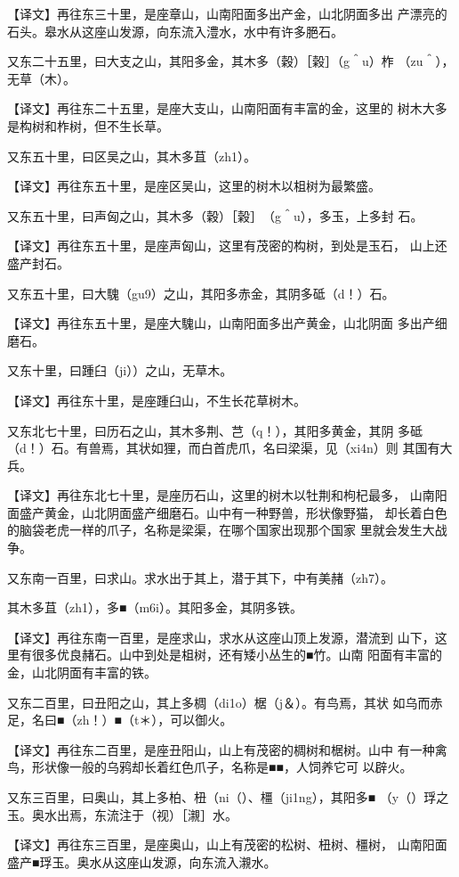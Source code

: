 \documentclass[a4paper,12pt,UTF8,twoside]{ctexbook}
\begin{document}
【译文】再往东三十里，是座章山，山南阳面多出产金，山北阴面多出 产漂亮的石头。皋水从这座山发源，向东流入澧水，水中有许多脃石。

又东二十五里，曰大支之山，其阳多金，其木多（穀）［榖］（g＾u）柞 （zu＾），无草（木）。

【译文】再往东二十五里，是座大支山，山南阳面有丰富的金，这里的 树木大多是构树和柞树，但不生长草。

又东五十里，曰区吴之山，其木多苴（zh1）。

【译文】再往东五十里，是座区吴山，这里的树木以柤树为最繁盛。

又东五十里，曰声匈之山，其木多（穀）［榖］　（g＾u），多玉，上多封 石。

【译文】再往东五十里，是座声匈山，这里有茂密的构树，到处是玉石， 山上还盛产封石。

又东五十里，曰大騩（gu9）之山，其阳多赤金，其阴多砥（d！）石。

【译文】再往东五十里，是座大騩山，山南阳面多出产黄金，山北阴面 多出产细磨石。

又东十里，曰踵臼（ji））之山，无草木。

【译文】再往东十里，是座踵臼山，不生长花草树木。

又东北七十里，曰历石之山，其木多荆、芑（q！），其阳多黄金，其阴 多砥（d！）石。有兽焉，其状如狸，而白首虎爪，名曰梁渠，见（xi4n）则 其国有大兵。

【译文】再往东北七十里，是座历石山，这里的树木以牡荆和枸杞最多， 山南阳面盛产黄金，山北阴面盛产细磨石。山中有一种野兽，形状像野猫， 却长着白色的脑袋老虎一样的爪子，名称是梁渠，在哪个国家出现那个国家 里就会发生大战争。

又东南一百里，曰求山。求水出于其上，潜于其下，中有美赭（zh7）。

其木多苴（zh1），多■（m6i）。其阳多金，其阴多铁。

【译文】再往东南一百里，是座求山，求水从这座山顶上发源，潜流到 山下，这里有很多优良赭石。山中到处是柤树，还有矮小丛生的■竹。山南 阳面有丰富的金，山北阴面有丰富的铁。

又东二百里，曰丑阳之山，其上多椆（di1o）椐（j＆）。有鸟焉，其状 如乌而赤足，名曰■（zh！）■（t＊），可以御火。

【译文】再往东二百里，是座丑阳山，山上有茂密的椆树和椐树。山中 有一种禽鸟，形状像一般的乌鸦却长着红色爪子，名称是■■，人饲养它可 以辟火。

又东三百里，曰奥山，其上多柏、杻（ni（）、橿（ji1ng），其阳多■ （y（）琈之玉。奥水出焉，东流注于（视）［瀙］水。

【译文】再往东三百里，是座奥山，山上有茂密的松树、杻树、橿树， 山南阳面盛产■琈玉。奥水从这座山发源，向东流入瀙水。
\end{document}
